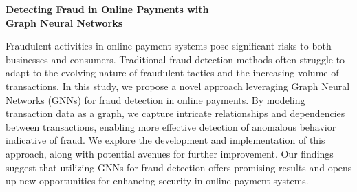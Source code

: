 \newpage
\begin{center}
	\Large{\textbf{Detecting Fraud in Online Payments with \\Graph Neural Networks}} \\
\end{center}
\hspace{\parindent}
Fraudulent activities in online payment systems pose significant risks to both businesses and consumers. Traditional fraud detection methods often struggle to adapt to the evolving nature of fraudulent tactics and the increasing volume of transactions. In this study, we propose a novel approach leveraging Graph Neural Networks (GNNs) for fraud detection in online payments. By modeling transaction data as a graph, we capture intricate relationships and dependencies between transactions, enabling more effective detection of anomalous behavior indicative of fraud. We explore the development and implementation of this approach, along with potential avenues for further improvement. Our findings suggest that utilizing GNNs for fraud detection offers promising results and opens up new opportunities for enhancing security in online payment systems.


